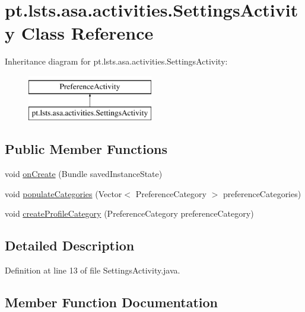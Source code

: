 \hypertarget{classpt_1_1lsts_1_1asa_1_1activities_1_1SettingsActivity}{}\section{pt.\+lsts.\+asa.\+activities.\+Settings\+Activity Class Reference}
\label{classpt_1_1lsts_1_1asa_1_1activities_1_1SettingsActivity}
Inheritance diagram for pt.\+lsts.\+asa.\+activities.\+Settings\+Activity\+:\begin{figure}[H]
\begin{center}
\leavevmode
\includegraphics[height=2.000000cm]{classpt_1_1lsts_1_1asa_1_1activities_1_1SettingsActivity}
\end{center}
\end{figure}
\subsection*{Public Member Functions}
\begin{DoxyCompactItemize}
\item 
void \hyperlink{classpt_1_1lsts_1_1asa_1_1activities_1_1SettingsActivity_a296125633c21a4a8b4e15724c6e8ab7d}{on\+Create} (Bundle saved\+Instance\+State)
\item 
void \hyperlink{classpt_1_1lsts_1_1asa_1_1activities_1_1SettingsActivity_af852a6cfd3386e246801c1091ce829ca}{populate\+Categories} (Vector$<$ Preference\+Category $>$ preference\+Categories)
\item 
void \hyperlink{classpt_1_1lsts_1_1asa_1_1activities_1_1SettingsActivity_a89f11eba0b242b9ef305e5a867cc6c44}{create\+Profile\+Category} (Preference\+Category preference\+Category)
\end{DoxyCompactItemize}


\subsection{Detailed Description}


Definition at line 13 of file Settings\+Activity.\+java.



\subsection{Member Function Documentation}
\hypertarget{classpt_1_1lsts_1_1asa_1_1activities_1_1SettingsActivity_a89f11eba0b242b9ef305e5a867cc6c44}{}
